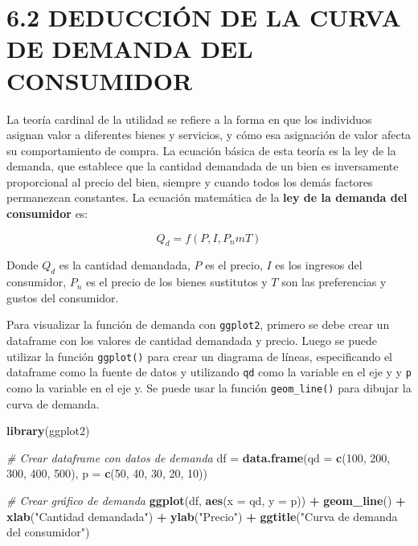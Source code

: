 \documentclass[
  spanish,
  12pt,
]{book}
\newenvironment{Shaded}{\begin{snugshade}}{\end{snugshade}}
\newcommand{\AttributeTok}[1]{\textcolor[rgb]{0.13,0.29,0.53}{#1}}
\newcommand{\CommentTok}[1]{\textcolor[rgb]{0.56,0.35,0.01}{\textit{#1}}}
\newcommand{\DecValTok}[1]{\textcolor[rgb]{0.00,0.00,0.81}{#1}}
\newcommand{\FunctionTok}[1]{\textcolor[rgb]{0.13,0.29,0.53}{\textbf{#1}}}
\newcommand{\NormalTok}[1]{#1}
\newcommand{\OtherTok}[1]{\textcolor[rgb]{0.56,0.35,0.01}{#1}}
\newcommand{\SpecialCharTok}[1]{\textcolor[rgb]{0.81,0.36,0.00}{\textbf{#1}}}
\newcommand{\StringTok}[1]{\textcolor[rgb]{0.31,0.60,0.02}{#1}}
\begin{document}
\section{6.2 DEDUCCIÓN DE LA CURVA DE DEMANDA DEL
CONSUMIDOR}\label{deducciuxf3n-de-la-curva-de-demanda-del-consumidor}

La teoría cardinal de la utilidad se refiere a la forma en que los
individuos asignan valor a diferentes bienes y servicios, y cómo esa
asignación de valor afecta su comportamiento de compra. La ecuación
básica de esta teoría es la ley de la demanda, que establece que la
cantidad demandada de un bien es inversamente proporcional al precio del
bien, siempre y cuando todos los demás factores permanezcan constantes.
La ecuación matemática de la \textbf{ley de la demanda del consumidor}
es:

\begin{equation}
Q_{d} = f(P,I,P_{n}mT)
\end{equation}

Donde \(Q_{d}\) es la cantidad demandada, \(P\) es el precio, \(I\) es
los ingresos del consumidor, \(P_{n}\) es el precio de los bienes
sustitutos y \(T\) son las preferencias y gustos del consumidor.

Para visualizar la función de demanda con \texttt{ggplot2}, primero se
debe crear un dataframe con los valores de cantidad demandada y precio.
Luego se puede utilizar la función \texttt{ggplot()} para crear un
diagrama de líneas, especificando el dataframe como la fuente de datos y
utilizando \texttt{qd} como la variable en el eje y y \texttt{p} como la
variable en el eje y. Se puede usar la función \texttt{geom\_line()}
para dibujar la curva de demanda.

\begin{Shaded}
\begin{Highlighting}[]
\FunctionTok{library}\NormalTok{(ggplot2)}

\CommentTok{\# Crear dataframe con datos de demanda}
\NormalTok{df }\OtherTok{=} \FunctionTok{data.frame}\NormalTok{(}\AttributeTok{qd =} \FunctionTok{c}\NormalTok{(}\DecValTok{100}\NormalTok{, }\DecValTok{200}\NormalTok{, }\DecValTok{300}\NormalTok{, }\DecValTok{400}\NormalTok{, }\DecValTok{500}\NormalTok{), }
                 \AttributeTok{p =} \FunctionTok{c}\NormalTok{(}\DecValTok{50}\NormalTok{, }\DecValTok{40}\NormalTok{, }\DecValTok{30}\NormalTok{, }\DecValTok{20}\NormalTok{, }\DecValTok{10}\NormalTok{))}

\CommentTok{\# Crear gráfico de demanda}
\FunctionTok{ggplot}\NormalTok{(df, }\FunctionTok{aes}\NormalTok{(}\AttributeTok{x =}\NormalTok{ qd, }\AttributeTok{y =}\NormalTok{ p)) }\SpecialCharTok{+} 
  \FunctionTok{geom\_line}\NormalTok{() }\SpecialCharTok{+} 
  \FunctionTok{xlab}\NormalTok{(}\StringTok{"Cantidad demandada"}\NormalTok{) }\SpecialCharTok{+} 
  \FunctionTok{ylab}\NormalTok{(}\StringTok{"Precio"}\NormalTok{) }\SpecialCharTok{+} 
  \FunctionTok{ggtitle}\NormalTok{(}\StringTok{"Curva de demanda del consumidor"}\NormalTok{)}
\end{Highlighting}
\end{Shaded}
\end{document}

